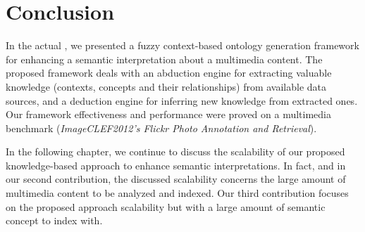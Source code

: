 	\section{Conclusion}
		\label{c2_4}

		In the actual , we presented a fuzzy context-based ontology generation 
		framework for enhancing a semantic interpretation about a multimedia content. 
		The proposed framework deals with an abduction engine for extracting valuable 
		knowledge (contexts, concepts and their relationships) from available data sources, 
		and a deduction engine for inferring new knowledge from extracted ones. Our framework
		effectiveness and performance were proved on a multimedia benchmark 
		(\emph{ImageCLEF2012's Flickr Photo Annotation and Retrieval}).
		
		In the following chapter, we continue to discuss the scalability of our proposed knowledge-based 
		approach to enhance semantic interpretations. In fact, and in our second contribution, 
		the discussed scalability concerns the large amount of multimedia content to be analyzed and 
		indexed. Our third contribution focuses on the proposed approach scalability 
		but with a large amount of semantic concept to index with.

		
		

